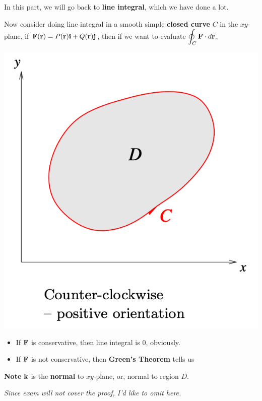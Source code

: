 \begin{spacing}{1.3}
    {\blue In this part, we will go back to {\bf line integral}, which we have done a lot.}

    Now consider doing line integral in a smooth simple {\bf closed curve} $C$ in the $xy$-plane,
    if ${\bf F}({\bf r})=P({\bf r}){\bf i}+Q({\bf r}){\bf j}$, then if we want to evaluate $\displaystyle \oint_C{\bf F}\cdot d{\bf r}$,
    \begin{center}
        \includegraphics[scale=0.43]{images/Ch16-green-closed-path.png}
    \end{center}
    \begin{itemize}
        \item If ${\bf F}$ is conservative, then line integral is 0, obviously.
        \item If ${\bf F}$ is not conservative, then {\bf Green's Theorem} tells us 
        \begin{center}
        \end{center}
    \end{itemize}
    {\bf Note} ${\bf k}$ is the {\bf normal} to $xy$-plane, or, normal to region $D$.

    \vspace{0.3in}
    {\it Since exam will not cover the proof, I'd like to omit here.}


\end{spacing}
